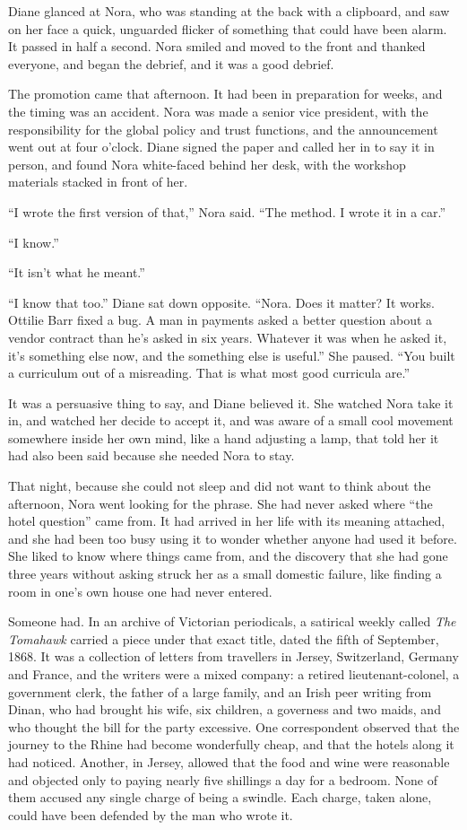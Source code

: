 Diane glanced at Nora, who was standing at the back with a clipboard, and saw on her face a quick, unguarded flicker of something that could have been alarm. It passed in half a second. Nora smiled and moved to the front and thanked everyone, and began the debrief, and it was a good debrief.

The promotion came that afternoon. It had been in preparation for weeks, and the timing was an accident. Nora was made a senior vice president, with the responsibility for the global policy and trust functions, and the announcement went out at four o'clock. Diane signed the paper and called her in to say it in person, and found Nora white-faced behind her desk, with the workshop materials stacked in front of her.

``I wrote the first version of that,'' Nora said. ``The method. I wrote it in a car.''

``I know.''

``It isn't what he meant.''

``I know that too.'' Diane sat down opposite. ``Nora. Does it matter? It works. Ottilie Barr fixed a bug. A man in payments asked a better question about a vendor contract than he's asked in six years. Whatever it was when he asked it, it's something else now, and the something else is useful.'' She paused. ``You built a curriculum out of a misreading. That is what most good curricula are.''

It was a persuasive thing to say, and Diane believed it. She watched Nora take it in, and watched her decide to accept it, and was aware of a small cool movement somewhere inside her own mind, like a hand adjusting a lamp, that told her it had also been said because she needed Nora to stay.

That night, because she could not sleep and did not want to think about the afternoon, Nora went looking for the phrase. She had never asked where ``the hotel question'' came from. It had arrived in her life with its meaning attached, and she had been too busy using it to wonder whether anyone had used it before. She liked to know where things came from, and the discovery that she had gone three years without asking struck her as a small domestic failure, like finding a room in one's own house one had never entered.

Someone had. In an archive of Victorian periodicals, a satirical weekly called \emph{The Tomahawk} carried a piece under that exact title, dated the fifth of September, 1868. It was a collection of letters from travellers in Jersey, Switzerland, Germany and France, and the writers were a mixed company: a retired lieutenant-colonel, a government clerk, the father of a large family, and an Irish peer writing from Dinan, who had brought his wife, six children, a governess and two maids, and who thought the bill for the party excessive. One correspondent observed that the journey to the Rhine had become wonderfully cheap, and that the hotels along it had noticed. Another, in Jersey, allowed that the food and wine were reasonable and objected only to paying nearly five shillings a day for a bedroom. None of them accused any single charge of being a swindle. Each charge, taken alone, could have been defended by the man who wrote it.

